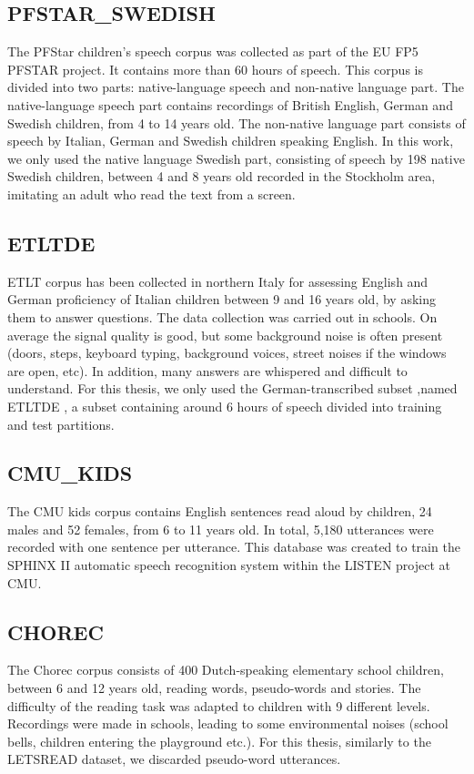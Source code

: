 \subsection{PFSTAR\_SWEDISH}
The PFStar children's speech corpus \cite{pfstar} was collected as part of the EU FP5 PFSTAR project. It contains more than 60 hours of speech. This corpus is divided into two parts: native-language speech and non-native language part.
The native-language speech part contains recordings of British English, German and Swedish children, from 4 to 14 years old. The non-native language part consists of speech by Italian, German and Swedish children speaking English. In this work, we only used the native language Swedish part, consisting of speech by 198 native Swedish children, between 4 and 8 years old recorded in the Stockholm area, imitating an adult who read the text from a screen.
\subsection{ETLTDE}
\ac{ETLT} corpus \cite{etlt} has been collected in northern Italy for assessing English and German proficiency of Italian children between 9 and 16 years old, by asking them to answer questions. The data collection was carried out in schools. On average the signal quality is good, but some background noise is often present (doors, steps, keyboard typing, background voices, street noises if the windows are open, etc). In addition, many answers are whispered and difficult to understand.
For this thesis, we only used the German-transcribed subset ,named ETLTDE , a subset containing around 6 hours of speech divided into training and test partitions.
\subsection{CMU\_KIDS}
The \ac{CMU} kids corpus \cite{cmu} contains English sentences read aloud by children, 24 males and 52 females, from 6 to 11 years old. In total, 5,180 utterances were recorded with one sentence per utterance. This database was created to train the SPHINX II \cite{sphinx2} automatic speech recognition system within the LISTEN project at \ac{CMU}.
\subsection{CHOREC}
\label{subsection:chorec}
The Chorec corpus \cite{chorec} consists of 400 Dutch-speaking elementary school children, between 6 and 12 years old, reading words, pseudo-words and stories. The difficulty of the reading task was adapted to children with 9 different levels. Recordings were made in schools, leading to some environmental noises (school bells, children entering the playground etc.). For this thesis, similarly to the LETSREAD dataset, we discarded pseudo-word utterances.

